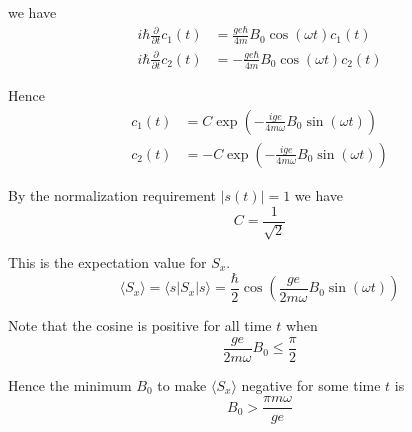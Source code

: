 we have
\begin{align*}
i\hbar\frac{\partial}{\partial t}c_1(t)&=\frac{ge\hbar}{4m}B_0\cos(\omega t)c_1(t)
\\
i\hbar\frac{\partial}{\partial t}c_2(t)&=-\frac{ge\hbar}{4m}B_0\cos(\omega t)c_2(t)
\end{align*}

Hence
\begin{equation*}
\begin{aligned}
c_1(t)&=C\exp\left(-\frac{ige}{4m\omega}B_0\sin(\omega t)\right)
\\
c_2(t)&=-C\exp\left(-\frac{ige}{4m\omega}B_0\sin(\omega t)\right)
\end{aligned}
\tag{1}
\end{equation*}

By the normalization requirement $|s(t)|=1$ we have
\begin{equation*}
C=\frac{1}{\sqrt2}
\end{equation*}

This is the expectation value for $S_x$.
\begin{equation*}
\langle S_x\rangle=\langle s|S_x|s\rangle
=\frac{\hbar}{2}\cos\left(\frac{ge}{2m\omega}B_0\sin(\omega t)\right)
\tag{2}
\end{equation*}

Note that the cosine is positive for all time $t$ when
\begin{equation*}
\frac{ge}{2m\omega}B_0\le\frac{\pi}{2}
\end{equation*}

Hence the minimum $B_0$ to make $\langle S_x\rangle$ negative for some time $t$ is
\begin{equation*}
B_0>\frac{\pi m\omega}{ge}
\end{equation*}



